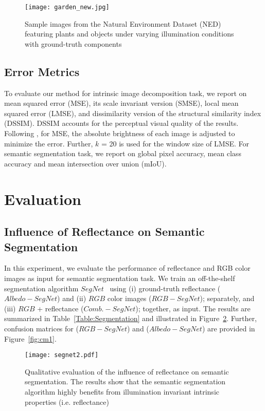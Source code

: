 \documentclass[runningheads]{llncs}
\begin{document}
\begin{figure}[t]
    \centering
    \texttt{[image: garden\_new.jpg]}
    \caption{Sample images from the Natural Environment Dataset (NED) featuring plants and objects under varying illumination conditions with ground-truth components}
    \label{fig:garden}
\end{figure}

\subsection{Error Metrics}
To evaluate our method for intrinsic image decomposition task, we report on mean squared error (MSE), its scale invariant version (SMSE), local mean squared error (LMSE), and dissimilarity version of the structural similarity index (DSSIM). DSSIM accounts for the perceptual visual quality of the results. Following \cite{mit}, for MSE, the absolute brightness of each image is adjusted to minimize the error. Further, $k$ = 20 is used for the window size of LMSE. For semantic segmentation task, we report on global pixel accuracy, mean class accuracy and mean intersection over union (mIoU).

\section{Evaluation}

\subsection{Influence of Reflectance on Semantic Segmentation}
In this experiment, we evaluate the performance of reflectance and RGB color images as input for semantic segmentation task. We train an off-the-shelf segmentation algorithm $SegNet$~\cite{segnet} using (i) ground-truth reflectance ($Albedo-SegNet$) and (ii) $RGB$ color images ($RGB-SegNet$); separately, and (iii) $RGB$ + reflectance ($Comb.-SegNet$); together, as input. The results are summarized in Table~\ref{Table:Segmentation} and illustrated in Figure~\ref{fig:segnet2}. Further, confusion matrices for ($RGB-SegNet$) and ($Albedo-SegNet$) are provided in Figure~\ref{fig:cm1}.

\begin{figure}[t]
    \centering
    \texttt{[image: segnet2.pdf]}
    \caption{Qualitative evaluation of the influence of reflectance on semantic segmentation. The results show that the semantic segmentation algorithm highly benefits from illumination invariant intrinsic properties (i.e. reflectance)}
    \label{fig:segnet2}
\end{figure}
\end{document}
